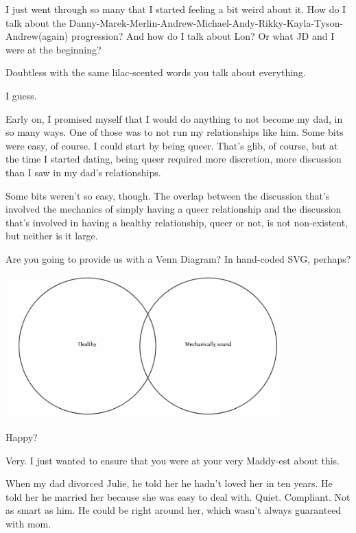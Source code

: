 \begin{paracol}{2}
\begin{leftcolumn}
I just went through so many that I started feeling a bit weird about it. How do I talk about the Danny-Marek-Merlin-Andrew-Michael-Andy-Rikky-Kayla-Tyson-Andrew(again) progression? And how do I talk about Lon? Or what JD and I were at the beginning?

\begin{ally}
Doubtless with the same lilac-scented words you talk about everything.
\end{ally}
I guess.

Early on, I promised myself that I would do anything to not become my dad, in so many ways. One of those was to not run my relationships like him. Some bits were easy, of course. I could start by being queer. That's glib, of course, but at the time I started dating, being queer required more discretion, more discussion than I saw in my dad's relationships.

Some bits weren't so easy, though. The overlap between the discussion that's involved the mechanics of simply having a queer relationship and the discussion that's involved in having a healthy relationship, queer or not, is not non-existent, but neither is it large.

\begin{ally}
Are you going to provide us with a Venn Diagram? In hand-coded SVG, perhaps?
\end{ally}

\noindent\includegraphics[width=4.25in]{assets/static/healthy-sound.png}

Happy?

\begin{ally}
Very. I just wanted to ensure that you were at your very Maddy-est about this.
\end{ally}
When my dad divorced Julie, he told her he hadn't loved her in ten years. He told her he married her because she was easy to deal with. Quiet. Compliant. Not as smart as him. He could be right around her, which wasn't always guaranteed with mom.


\end{leftcolumn}
\end{paracol}

